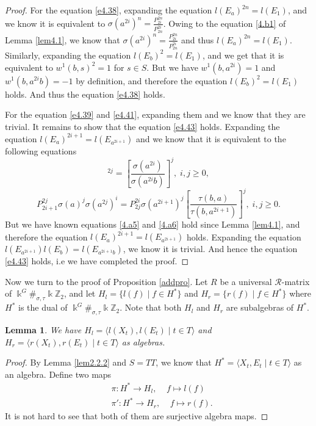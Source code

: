 \documentclass[a4paper,11pt]{amsart}
\numberwithin{equation}{section}
\newtheorem{lemma}[theorem]{Lemma}
\begin{document}
\begin{proof}
For the equation \ref{e4.38}, expanding the equation $l(E_a)^{2n}=l(E_1)$, and we know it is equivalent to $\sigma(a^{2i})^n=\frac{P_{2i}^{2n}}{P_{2n}^{2i}}$. Owing to the equation \ref{4.b1} of Lemma \ref{lem4.1}, we know that $\sigma(a^{2i})^n=\frac{P_{2i}^{2n}}{P_{2n}^{2i}}$ and thus $l(E_a)^{2n}=l(E_1)$. Similarly, expanding the equation $l(E_b)^2=l(E_1)$, and we get that it is equivalent to $w^1(b,s)^2=1$ for $s\in S$. But we have $w^1(b,a^{2i})=1$ and $w^1(b,a^{2i}b)=-1$ by definition, and therefore the equation $l(E_b)^2=l(E_1)$ holds. And thus the equation \ref{e4.38} holds.

For the equation \ref{e4.39} and \ref{e4.41}, expanding them and we know that they are trivial. It remains to show that the equation \ref{e4.43} holds. Expanding the equation $l(E_a)^{2i+1}=l(E_{a^{2i+1}})$ and we know that it is equivalent to the following equations
\begin{equation} [\frac{\tau(b,a)\beta}{\tau(b,a^{2i})\alpha}]^{2j}=[\frac{\sigma(a^{2i})}{\sigma(a^{2i}b)}]^j,\; i,j\geq 0, \label{4.a5}
\end{equation}
\begin{equation}
P_{2i+1}^{2j}\sigma(a)^j\sigma(a^{2j})^i=P_{2j}^{2i}\sigma(a^{2i+1})^j
[\frac{\tau(b,a)}{\tau(b,a^{2i+1})}]^j,\;i,j\geq 0. \label{4.a6}
\end{equation}
But we have known equations \ref{4.a5} and \ref{4.a6} hold since Lemma \ref{lem4.1}, and therefore the equation $l(E_a)^{2i+1}=l(E_{a^{2i+1}})$ holds. Expanding the equation $l(E_{a^{2i+1}})l(E_b)=l(E_{a^{2i+1}b})$, we know it is trivial. And hence the equation \ref{e4.43} holds, i.e we have completed the proof.
\fi
\end{proof}

Now we turn to the proof of Proposition \ref{addpro}. Let $R$ be a universal $\mathcal{R}$-matrix of $\Bbbk^G\#_{\sigma,\tau}\Bbbk \mathbb{Z}_{2}$, and let $H_l=\{l(f)\;|\;f\in H^*\}$ and $H_r=\{r(f)\;|\;f\in H^*\}$ where $H^*$ is the dual of $\Bbbk^G\#_{\sigma,\tau}\Bbbk \mathbb{Z}_{2}$. Note that both $H_l$ and $H_r$ are subalgebras of $H^\ast.$
\begin{lemma}\label{lemm3.2} We have
$H_l=\langle l(X_t),l(E_t)\;|\;t\in T\rangle $ and $H_r=\langle r(X_t),r(E_t)\;|\;t\in T\rangle $ as algebras.
\end{lemma}

\begin{proof}
By Lemma \ref{lem2.2.2} and $S=TT$, we know that $H^*=\langle X_t,E_t\;|\;t\in T\rangle $ as an algebra. Define two maps
\begin{align*}&\pi:H^*\rightarrow H_l,\;\;\;\; f\mapsto l(f)\\
 &\pi':H^*\rightarrow H_r,\;\;\;\; f\mapsto r(f).\end{align*}
 It is not hard to see that both of them are surjective algebra maps.
\end{proof}
\end{document}
